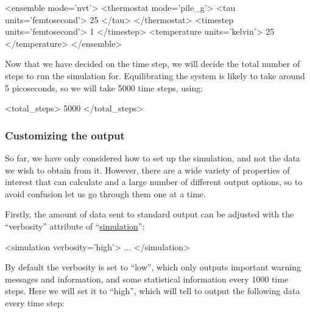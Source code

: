 \documentclass[11pt,english,fleqn]{report}
\newenvironment{code}{%
\footnotesize 
\verbatim
}{
\endverbatim
\normalsize
}
\begin{document}
\begin{code}
<ensemble mode='nvt'>
   <thermostat mode='pile_g'>
      <tau units='femtosecond'> 25 </tau>
   </thermostat>
   <timestep units='femtosecond'> 1 </timestep>
   <temperature units='kelvin'> 25 </temperature>
</ensemble>
\end{code}

Now that we have decided on the time step, we will decide the total
number of steps to run the simulation for. Equilibrating the system
is likely to take around 5 picoseconds, so we will take 5000 time
steps, using:

\begin{code}
<total_steps> 5000 </total_steps>
\end{code}

\subsubsection{Customizing the output}

So far, we have only considered how to set up the simulation, and not
the data we wish to obtain from it. However, there are a wide
variety of properties of interest that \ipi can calculate 
and a large number of different output
options, so to avoid confusion let us go through them one at a time.

Firstly, the amount of data sent to standard output can be adjusted
with the {}``verbosity'' attribute of 
{}``\hyperref[SIMULATION]{simulation}'':

\begin{code}
<simulation verbosity='high'>
   ...
</simulation>
\end{code}

By default the verbosity is set to {}``low'', which only outputs
important warning messages and information, and some statistical 
information every 1000 time steps. Here we will set it to 
{}``high'', which will 
tell \ipi to output the following data every time step:
\end{document}
